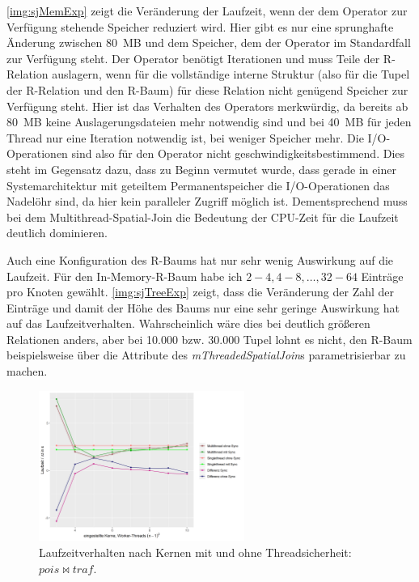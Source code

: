 \documentclass[a4paper,12pt,twoside]{article}
\newcommand{\Fb}[1]{\textit{#1}} %
\begin{document}
\autoref{img:sjMemExp} zeigt die Veränderung der Laufzeit, wenn der dem Operator zur Verfügung stehende Speicher reduziert wird. Hier gibt es nur eine sprunghafte Änderung zwischen 80~MB und dem Speicher, dem der Operator im Standardfall zur Verfügung steht. Der Operator benötigt Iterationen und muss Teile der R-Relation auslagern, wenn für die vollständige interne Struktur (also für die Tupel der R-Relation und den R-Baum) für diese Relation nicht genügend Speicher zur Verfügung steht. Hier ist das Verhalten des Operators merkwürdig, da bereits ab 80~MB keine Auslagerungsdateien mehr notwendig sind und bei 40~MB für jeden Thread nur eine Iteration notwendig ist, bei weniger Speicher mehr. Die I/O-Operationen sind also für den Operator nicht geschwindigkeitsbestimmend. Dies steht im Gegensatz dazu, dass zu Beginn vermutet wurde, dass gerade in einer Systemarchitektur mit geteiltem Permanentspeicher die I/O-Operationen das Nadelöhr sind, da hier kein paralleler Zugriff möglich ist. Dementsprechend muss bei dem Multithread-Spatial-Join die Bedeutung der CPU-Zeit für die Laufzeit deutlich dominieren.

Auch eine Konfiguration des R-Baums hat nur sehr wenig Auswirkung auf die Laufzeit. Für den In-Memory-R-Baum habe ich $2-4, 4-8, \ldots, 32-64$ Einträge pro Knoten gewählt. \autoref{img:sjTreeExp} zeigt, dass die Veränderung der Zahl der Einträge und damit der Höhe des Baums nur eine sehr geringe Auswirkung hat auf das Laufzeitverhalten. Wahrscheinlich wäre dies bei deutlich größeren Relationen anders, aber bei 10.000 bzw. 30.000 Tupel lohnt es nicht, den R-Baum beispielsweise über die Attribute des \Fb{mThreadedSpatialJoin}s parametrisierbar zu machen.   

\begin{figure}
	\centering
	\includegraphics[width=0.6\textwidth]{Bilder/sj_nosync.png}
	\caption{Laufzeitverhalten nach Kernen mit und ohne Threadsicherheit: $pois \bowtie traf$.}
	\label{img:sjSync}
\end{figure}
\end{document}
